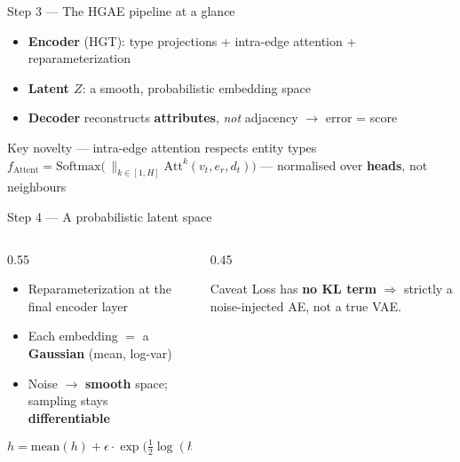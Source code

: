 \documentclass[10pt,aspectratio=169]{beamer}
\newcommand{\hl}[1]{\textcolor{mBlue}{\textbf{#1}}}    %
\newcommand{\bl}[1]{\textcolor{mDark}{\textbf{#1}}}    %
\newcommand{\gr}[1]{\textcolor{mGreen}{\textbf{#1}}}   %
\newcommand{\rd}[1]{\textcolor{mRed}{\textbf{#1}}}     %
\newenvironment{caveat}{\begin{alertblock}{Caveat}}{\end{alertblock}}
\begin{document}
\begin{frame}{Step 3 --- The HGAE pipeline at a glance}
  \centering
  
  \vspace{0.6em}
  \begin{itemize}\footnotesize
    \item<2-> \bl{Encoder} (HGT): type projections + intra-edge attention + reparameterization
    \item<3-> \hl{Latent $Z$}: a smooth, probabilistic embedding space
    \item<4-> \textbf{Decoder} reconstructs \rd{attributes}, \emph{not} adjacency $\rightarrow$ error = score
  \end{itemize}
\end{frame}

\begin{frame}{Key novelty --- intra-edge attention respects entity types}
  \centering
  \\[0.4em]
  {\footnotesize $f_{\text{Attent}}=\mathrm{Softmax}\!\big(\,\|_{k\in[1,H]}\mathrm{Att}^k(v_t,e_r,d_t)\big)$ \;---\; normalised over \gr{heads}, not neighbours}
\end{frame}

\begin{frame}{Step 4 --- A probabilistic latent space}
  \begin{columns}[T]
    \begin{column}{0.55\textwidth}
      \begin{itemize}
        \item Reparameterization at the final encoder layer
        \item Each embedding $=$ a \bl{Gaussian} (mean, log-var)
        \item Noise $\rightarrow$ \gr{smooth} space; sampling stays \hl{differentiable}
      \end{itemize}
      \[ h = \text{mean}(h) + \epsilon\cdot\exp\!\big(\tfrac12\log(h)\big),\quad \epsilon\sim\mathcal N(0,1) \]
    \end{column}
    \begin{column}{0.45\textwidth}
      \begin{caveat}
        Loss has \rd{no KL term} $\Rightarrow$ strictly a noise-injected AE, not a true VAE.
      \end{caveat}
    \end{column}
  \end{columns}
\end{frame}
\end{document}
